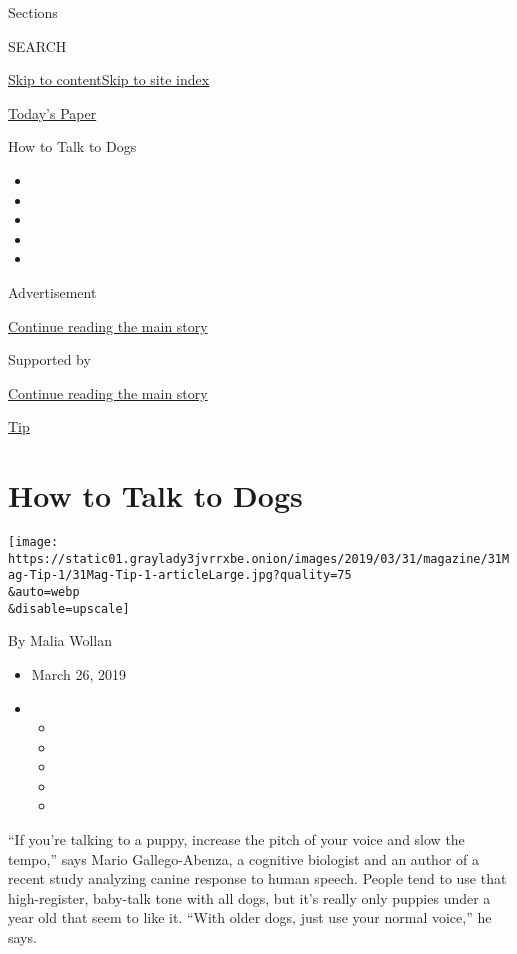 Sections

SEARCH

\protect\hyperlink{site-content}{Skip to
content}\protect\hyperlink{site-index}{Skip to site index}

\href{https://myaccount.nytimes3xbfgragh.onion/auth/login?response_type=cookie\&client_id=vi}{}

\href{https://www.nytimes3xbfgragh.onion/section/todayspaper}{Today's
Paper}

How to Talk to Dogs

\begin{itemize}
\item
\item
\item
\item
\item
\end{itemize}

Advertisement

\protect\hyperlink{after-top}{Continue reading the main story}

Supported by

\protect\hyperlink{after-sponsor}{Continue reading the main story}

\href{/column/magazine-tip}{Tip}

\hypertarget{how-to-talk-to-dogs}{%
\section{How to Talk to Dogs}\label{how-to-talk-to-dogs}}

\texttt{[image: https://static01.graylady3jvrrxbe.onion/images/2019/03/31/magazine/31Mag-Tip-1/31Mag-Tip-1-articleLarge.jpg?quality=75\\\&auto=webp\\\&disable=upscale]}

By Malia Wollan

\begin{itemize}
\item
  March 26, 2019
\item
  \begin{itemize}
  \item
  \item
  \item
  \item
  \item
  \end{itemize}
\end{itemize}

``If you're talking to a puppy, increase the pitch of your voice and
slow the tempo,'' says Mario Gallego-Abenza, a cognitive biologist and
an author of a recent study analyzing canine response to human speech.
People tend to use that high-register, baby-talk tone with all dogs, but
it's really only puppies under a year old that seem to like it. ``With
older dogs, just use your normal voice,'' he says.

